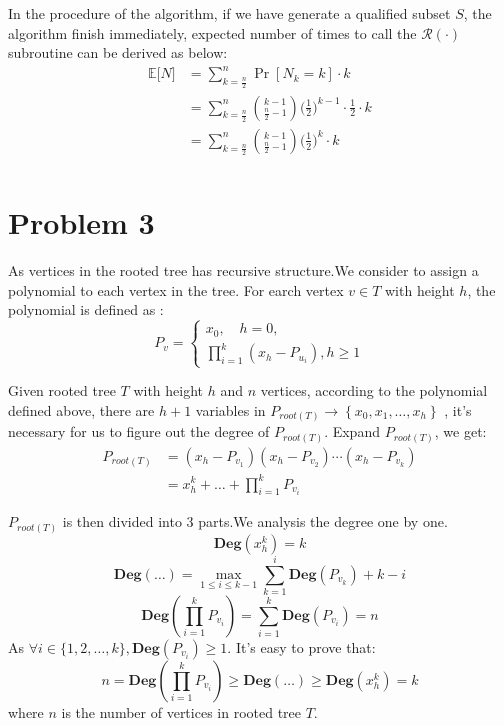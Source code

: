 \documentclass[a4paper, 12pt, titlepage]{article}
\begin{document}
In the procedure of the algorithm, if we have generate a qualified subset $S$, the algorithm finish immediately, expected number of times
to call the $\mathcal{R(\cdot)}$ subroutine can be derived as below:
\begin{equation}
    \begin{aligned}
        \mathbb E \big[ N \big] &= \sum_{k = \frac{n}{2}}^{n} \Pr[ N_{k} = k] \cdot k \\
                                &= \sum_{k = \frac{n}{2}}^{n} \binom{k - 1}{\frac{n}{2} - 1} \big( \frac{1}{2} \big)^{k - 1} \cdot \frac{1}{2} \cdot k \\
                                &= \sum_{k = \frac{n}{2}}^{n} \binom{k - 1}{\frac{n}{2} - 1} \big( \frac{1}{2} \big)^{k} \cdot k \\
    \end{aligned}
\end{equation}

\section{Problem 3}
As vertices in the rooted tree has recursive structure.We consider to assign a polynomial to each vertex in the tree.
For earch vertex $v \in T$ with height $h$, the polynomial is defined as :
\[
    P_{v} = \begin{cases}
        x_{0}, \quad h = 0,  \\
        \prod_{i = 1}^{k} \left( x_{h} - P_{u_{i}} \right), h \geq 1 
    \end{cases}
\]

Given rooted tree $T$ with height $h$ and $n$ vertices, according to the polynomial defined above, there are $h + 1$ variables in $P_{root(T)} \rightarrow \left\{ x_{0}, x_{1}, \ldots, x_{h} \right\}$ , 
it's necessary for us to figure out the degree of $P_{root(T)}$.
Expand $P_{root(T)}$, we get:
\begin{equation}
    \begin{aligned}
        P_{root(T)} &= \left( x_{h} - P_{v_{1}} \right) \left( x_{h} - P_{v_{2}} \right) \cdots \left( x_{h} - P_{v_{k}}\right) \\
                    &= x_{h}^{k} + \ldots + \prod_{i = 1}^{k} P_{v_{i}}
    \end{aligned}
\end{equation}

$P_{root(T)}$ is then divided into 3 parts.We analysis the degree one by one.
\[
    \mathbf{Deg} \left( x_{h}^{k} \right) = k
\]
\[
    \mathbf{Deg} \left( \ldots \right) = \max \limits_{1 \leq i \leq k - 1} \sum_{k = 1}^{i} {\mathbf{Deg} \left( P_{v_{k}} \right)} + k - i
\]
\[
    \mathbf{Deg} \left( \prod_{i = 1}^{k} P_{v_{i}} \right) = \sum_{i = 1}^{k} \mathbf{Deg} \left( P_{v_{i}}\right) = n
\]
As $\forall i \in \{1, 2, \ldots, k \}, \mathbf{Deg} \left( P_{v_{i}} \right) \geq 1$. It's easy to prove that: 
\[
    n = \mathbf{Deg} \left( \prod_{i = 1}^{k} P_{v_{i}} \right) \geq \mathbf{Deg} \left( \ldots \right) \geq \mathbf{Deg} \left( x_{h}^{k} \right) = k
\]
where $n$ is the number of vertices in rooted tree $T$.
\end{document}
